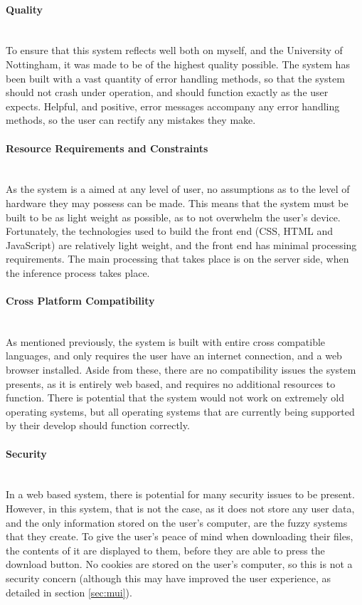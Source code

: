 \paragraph{Quality}\ \\
To ensure that this system reflects well both on myself, and the University of Nottingham, it was made to be of the highest quality possible. The system has been built with a vast quantity of error handling methods, so that the system should not crash under operation, and should function exactly as the user expects. Helpful, and positive, error messages accompany any error handling methods, so the user can rectify any mistakes they make. 

\paragraph{Resource Requirements and Constraints}\ \\
As the system is a aimed at any level of user, no assumptions as to the level of hardware they may possess can be made. This means that the system must be built to be as light weight as possible, as to not overwhelm the user's device. Fortunately, the technologies used to build the front end (CSS, HTML and JavaScript) are relatively light weight, and the front end has minimal processing requirements. The main processing that takes place is on the server side, when the inference process takes place.

\paragraph{Cross Platform Compatibility}\ \\
As mentioned previously, the system is built with entire cross compatible languages, and only requires the user have an internet connection, and a web browser installed. Aside from these, there are no compatibility issues the system presents, as it is entirely web based, and requires no additional resources to function. There is potential that the system would not work on extremely old operating systems, but all operating systems that are currently being supported by their develop should function correctly.

\paragraph{Security}\ \\
In a web based system, there is potential for many security issues to be present. However, in this system, that is not the case, as it does not store any user data, and the only information stored on the user's computer, are the fuzzy systems that they create. To give the user's peace of mind when downloading their files, the contents of it are displayed to them, before they are able to press the download button. No cookies are stored on the user's computer, so this is not a security concern (although this may have improved the user experience, as detailed in section \ref{sec:mui}).


